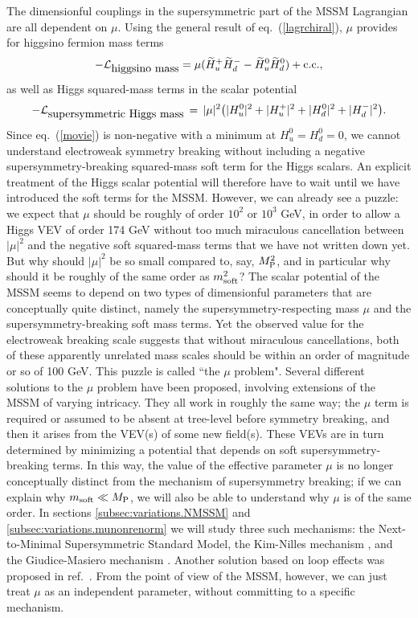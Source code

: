 \documentclass[11pt]{article}
\def\beq{\begin{eqnarray}}
\def\eeq{\end{eqnarray}}
\def\stilde{\widetilde}
\def\lagr{{\cal L}}
\def\conj{{{\rm c.c.}}}
\def\MPlanck{M_{\rm P}}
\begin{document}
The dimensionful couplings in the supersymmetric part of the MSSM
Lagrangian are all dependent on $\mu$. Using the general result of
eq.~(\ref{lagrchiral}), $\mu$ provides for higgsino fermion
mass terms
\beq
-\lagr_{\mbox{higgsino mass}}= \mu (\stilde H_u^+ \stilde H_d^- - \stilde 
H_u^0 \stilde
H_d^0)+ \conj,
\label{poody}
\eeq
as well as Higgs squared-mass terms in the scalar potential
\beq
-\lagr_{\mbox{supersymmetric Higgs mass}} \,=\, |\mu|^2 
\bigl 
(
|H_u^0|^2 + |H_u^+|^2 + |H_d^0|^2 + |H_d^-|^2 \bigr ).
\label{movie}
\eeq
Since eq.~(\ref{movie}) is non-negative with a minimum at
$H_u^0 = H_d^0 = 0$, we cannot understand
electroweak symmetry breaking without including a negative
supersymmetry-breaking squared-mass soft term for the Higgs scalars. An
explicit treatment of the Higgs scalar potential will therefore have to
wait until we have introduced the soft terms for the MSSM. However, we can
already see a puzzle: we expect that $\mu$ should be roughly of order
$10^2$ or $10^3$ GeV, in order to allow a Higgs VEV of order 174 GeV
without too much miraculous cancellation between $|\mu|^2$ and the
negative soft squared-mass terms that we have not written down yet. But
why should $|\mu|^2$ be so small compared to, say, $\MPlanck^2$, and in
particular why should it be roughly of the same order as $m^2_{\rm soft}$?
The scalar potential of the MSSM seems to depend on two types of
dimensionful parameters that are conceptually quite distinct, namely the
supersymmetry-respecting mass $\mu$ and the supersymmetry-breaking soft
mass terms. Yet the observed value for the electroweak breaking scale
suggests that without miraculous cancellations, both of these apparently
unrelated mass scales should be within an order of magnitude or so of 100
GeV. This puzzle is called ``the $\mu$ problem". Several different
solutions to the $\mu$ problem have been proposed, involving extensions of
the MSSM of varying intricacy. They all work in roughly the same way; the
$\mu$ term is required or assumed to be absent at tree-level before
symmetry breaking, and then it arises from the VEV(s) of some new
field(s). These VEVs are in turn determined by minimizing a potential that
depends on soft supersymmetry-breaking terms. In this way, the value of
the effective parameter $\mu$ is no longer conceptually distinct from the
mechanism of supersymmetry breaking; if we can explain why $m_{\rm soft}
\ll \MPlanck$, we will also be able to understand why $\mu$ is of the same
order. In sections \ref{subsec:variations.NMSSM} and
\ref{subsec:variations.munonrenorm}
we will study three such
mechanisms: the Next-to-Minimal Supersymmetric Standard Model, the Kim-Nilles mechanism 
\cite{KimNilles}, and the Giudice-Masiero 
mechanism \cite{GiudiceMasiero}. 
Another solution based on loop effects was
proposed in ref.~\cite{muproblemGMSB}. 
From the point of view of the MSSM, however, 
we can just treat $\mu$ as an independent parameter, without
committing to a specific mechanism. 
\end{document}
